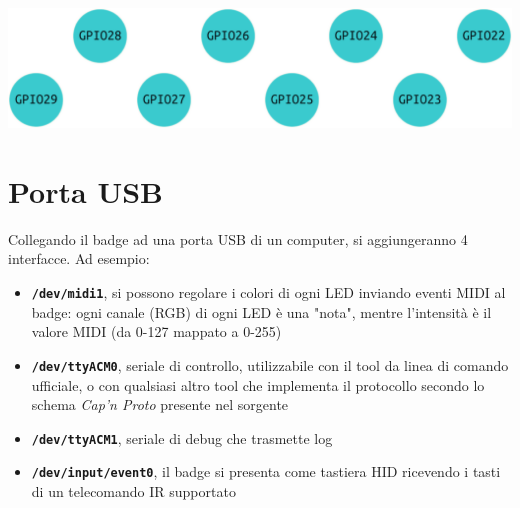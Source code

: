 \documentclass[10pt]{datasheet}
\newcommand*\circled[1]{\tikz[baseline=(char.base)]{
		\node[shape=circle,draw,inner sep=2pt, fill=white] (char) {#1};}}
\begin{document}
	\vfill\break
	\vspace*{-30pt}
	\begin{center}
		\includegraphics[scale=0.75]{gpio}

		
	\end{center}
\vspace*{-10pt}
\section{Porta USB}
Collegando il badge ad una porta USB di un computer, si aggiungeranno 4 interfacce. Ad esempio:
\vspace*{-10pt}
\begin{itemize}[itemsep=1pt]
	\item {\textbf{\texttt{/dev/midi1}}, si possono regolare i colori di ogni LED inviando eventi MIDI al badge: ogni canale (RGB) di ogni LED è una "nota", mentre l'intensità è il valore MIDI (da 0-127 mappato a 0-255)}
	\item{\textbf{\texttt{/dev/ttyACM0}}, seriale di controllo, utilizzabile con il tool da linea di comando ufficiale, o con qualsiasi altro tool che implementa il protocollo secondo lo schema \textit{Cap'n Proto} presente nel sorgente}
	\item{\textbf{\texttt{/dev/ttyACM1}}, seriale di debug che trasmette log}
	\item{\textbf{\texttt{/dev/input/event0}}}, il badge si presenta come tastiera HID ricevendo i tasti di un telecomando IR supportato
\end{itemize}
\vspace*{-10pt}
\end{document}
